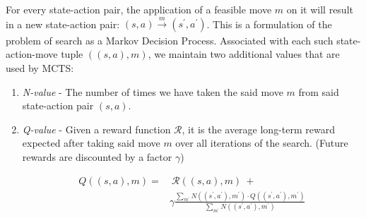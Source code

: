 
For every state-action pair, the application of a feasible move $m$ on it will result in a new state-action pair: $(s,a) \xrightarrow[]{m} (s^\prime,a^\prime)$. This is a formulation of the problem of search as a Markov Decision Process. Associated with each such state-action-move tuple $((s, a), m)$, we maintain two additional values that are used by MCTS:

\begin{enumerate}
\item \textit{N-value} - The number of times we have taken the said move $m$ from said state-action pair $(s,a)$.
\item \textit{Q-value} - Given a reward function $\mathcal{R}$, it is the average long-term reward expected after taking said move $m$ over all iterations of the search. (Future rewards are discounted by a factor $\gamma$)

\begin{equation}
\begin{split}
    Q((s,a), m) =&\ \mathcal{R}((s,a), m)\ + \\ & \gamma \frac{\sum_{m^\prime} N((s^\prime, a^\prime), m^\prime) \cdot Q((s^\prime, a^\prime), m^\prime)}{\sum_{m^\prime} N((s^\prime, a^\prime), m^\prime)}
\end{split}
\end{equation}

\end{enumerate}

